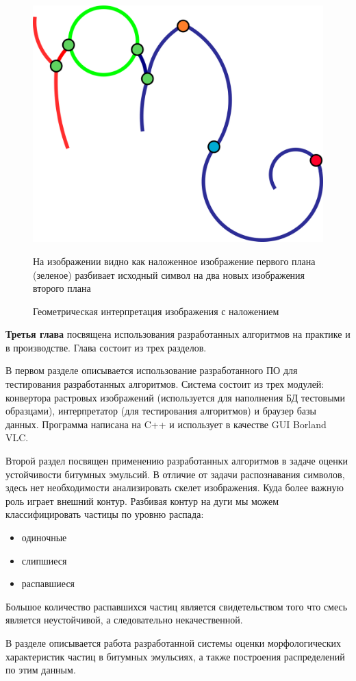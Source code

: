 \begin{figure}[h]
\centering
\includegraphics[width=0.55\linewidth,keepaspectratio]{images/overlaps}
\caption{Геометрическая интерпретация изображения с наложением}
\medskip
\small
На изображении видно как наложенное изображение первого плана (зеленое) разбивает исходный символ на два новых изображения второго плана
\end{figure}


\textbf{Третья глава} посвящена использования разработанных алгоритмов на практике и в производстве. Глава состоит из трех разделов.

В первом разделе описывается использование разработанного ПО для тестирования разработанных алгоритмов. Система состоит из трех модулей: конвертора растровых изображений (используется для наполнения БД тестовыми образцами), интерпретатор (для тестирования алгоритмов) и браузер базы данных. Программа написана на C++ и использует в качестве GUI Borland VLC.

Второй раздел посвящен применению разработанных алгоритмов в задаче оценки устойчивости битумных эмульсий. В отличие от задачи распознавания символов, здесь нет необходимости анализировать скелет изображения. Куда более важную роль играет внешний контур. Разбивая контур на дуги мы можем классифицировать частицы по уровню распада:
\begin{itemize}
\item одиночные
\item слипшиеся
\item распавшиеся
\end{itemize}
Большое количество распавшихся частиц является свидетельством того что смесь является неустойчивой, а следовательно некачественной.

В разделе описывается работа разработанной системы оценки морфологических характеристик частиц в битумных эмульсиях, а также построения распределений по этим данным.

